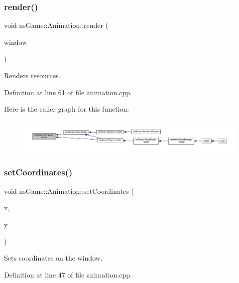 \subsubsection{\texorpdfstring{render()}{render()}}
{\footnotesize\ttfamily void ns\+Game\+::\+Animation\+::render (\begin{DoxyParamCaption}\item[{Min\+GL \&}]{window }\end{DoxyParamCaption})}



Renders resources. 



Definition at line 61 of file animation.\+cpp.

Here is the caller graph for this function\+:\nopagebreak
\begin{figure}[H]
\begin{center}
\leavevmode
\includegraphics[width=350pt]{classns_game_1_1_animation_a348e25058d77891160c015da88ea4837_icgraph}
\end{center}
\end{figure}
\mbox{\label{classns_game_1_1_animation_a626733cd1a3031caf438b656f1d805cd}} 
\subsubsection{\texorpdfstring{set\+Coordinates()}{setCoordinates()}}
{\footnotesize\ttfamily void ns\+Game\+::\+Animation\+::set\+Coordinates (\begin{DoxyParamCaption}\item[{int}]{x,  }\item[{int}]{y }\end{DoxyParamCaption})}



Sets coordinates on the window. 



Definition at line 47 of file animation.\+cpp.

\mbox{\label{classns_game_1_1_animation_a1a103b09407581b74933001fb8b3a8f0}} 
